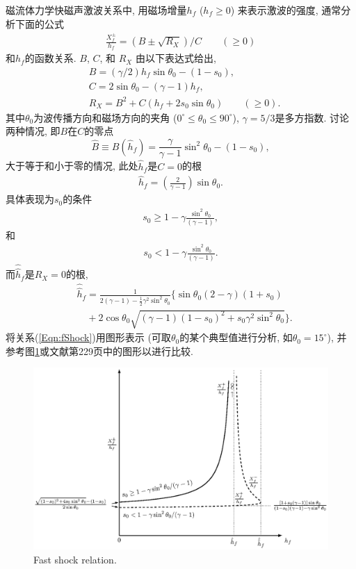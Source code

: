 \documentclass{article}
\begin{document}
	磁流体力学快磁声激波关系中\citep{Jeffrey1964}, 用磁场增量$h_f$ ($h_f \ge 0$)
	来表示激波的强度, 通常分析下面的公式
	\begin{align}
		\frac{X_f^\pm}{h_f} = (B \pm \sqrt{R_X})/C \qquad (\ge 0) \label{Eqn:fShock}
	\end{align}
	和$h_f$的函数关系. $B$, $C$, 和 $R_X$ 由以下表达式给出,
	\begin{align}
		& B = (\gamma/2) h_f \sin\theta_0 - (1-s_0),
		\\
		& C = 2 \sin\theta_0 - (\gamma-1) h_f,
		\\
		& R_X = B^2 + C(h_f + 2 s_0 \sin\theta_0) \qquad (\ge 0).
	\end{align}
	其中$\theta_0$为波传播方向和磁场方向的夹角 ($0^\circ \le \theta_0 \le 90^\circ$),
	$\gamma=5/3$是多方指数. 讨论两种情况, 即$B$在$C$的零点
	$$
	\hat{B} \equiv B(\hat{h}_f) = \frac{\gamma}{\gamma-1} \sin^2\theta_0 - (1-s_0),
	$$
	大于等于和小于零的情况, 此处$\hat{h}_f$是$C=0$的根
	\begin{align}
		\hat{h}_f = \left(\frac{2}{\gamma-1}\right) \sin\theta_0.
	\end{align}
	具体表现为$s_0$的条件
	\begin{align}
		s_0 \ge 1 - \gamma \frac{\sin^2\theta_0}{(\gamma-1)},
	\end{align}
	和
	\begin{align}
		s_0 < 1 - \gamma \frac{\sin^2\theta_0}{(\gamma-1)}.
	\end{align}
	而$\hat{\hat{h}}_f$是$R_X = 0$的根,
	\begin{align}
		& \hat{\hat{h}}_f = \frac{1}{2(\gamma-1) - \frac{1}{2} \gamma^2 \sin^2
			\theta_0}\Big\{\sin\theta_0
		(2-\gamma)(1+s_0) \nonumber
		\\
		& \quad + 2\cos\theta_0 \sqrt{(\gamma-1)(1-s_0)^2 + s_0 \gamma^2 \sin^2\theta_0}\Big\}.
	\end{align}
	将关系(\ref{Eqn:fShock})用图形表示
	(可取$\theta_0$的某个典型值进行分析, 如$\theta_0=15^\circ$),
	并参考图\ref{FShock}或文献\citet{Jeffrey1964}第229页中的图形以进行比较.
	\begin{figure}[htb]
		\centering
		\includegraphics[width=.9\textwidth]{fshock.eps}
		\caption{Fast shock relation.} \label{FShock}
	\end{figure}
\end{document}
